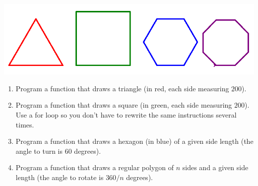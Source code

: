 \documentclass[11pt,class=report,crop=false]{standalone}
\begin{document}
\begin{activite}[Turtle]


\begin{center}
\includegraphics[scale=\myscale,scale=0.4]{screen-functions-tortue}
\end{center}

\begin{enumerate}
  \item Program a  function that draws a triangle (in red, each side measuring $200$).

  \item Program a  function that draws a square (in green, each side measuring $200$). Use a \og{}for\fg{} loop so you don't have to rewrite the same instructions several times.  
  
  \item Program a  function that draws a hexagon (in blue) of a given side length (the angle to turn is $60$ degrees).
  
  
  \item Program a  function that draws a regular polygon of $n$ sides and a given side length (the angle to rotate is $360/n$ degrees). 
\end{enumerate}

\end{activite}




\end{document}
